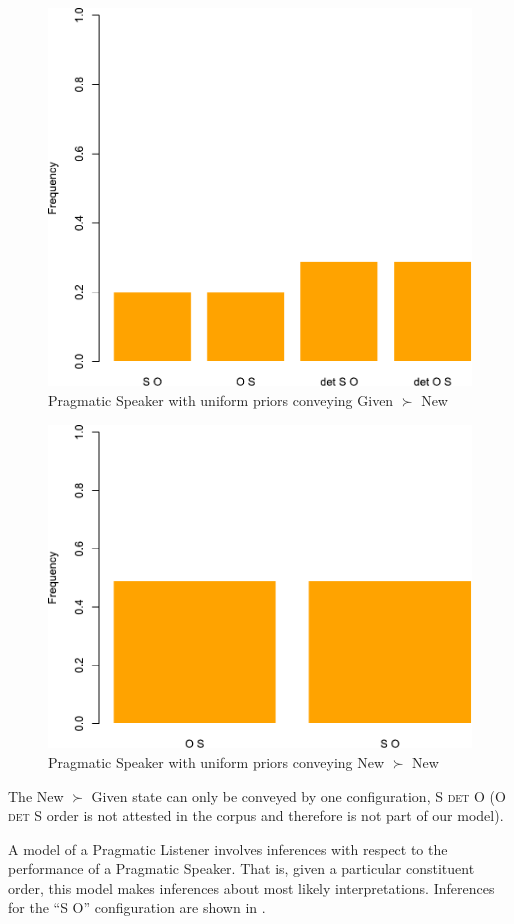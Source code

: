 \documentclass[output=paper,modfonts,nonflat]{langsci/langscibook}
\begin{document}
\begin{figure}
\includegraphics[width=.666\textwidth]{figures/plotPragmaticSpeakerGivenNewUniform}
\caption{Pragmatic Speaker with uniform priors conveying Given $\succ$ New}\label{figure:uniform3}
\end{figure}

\begin{figure}
\includegraphics[width=.666\textwidth]{figures/plotPragmaticSpeakerNewNewUniform}
\caption{Pragmatic Speaker with uniform priors conveying New $\succ$ New}\label{figure:uniform4}
\end{figure}

The New $\succ$ Given state can only be conveyed by one configuration, S {\scshape det} O (O {\scshape det} S order is not attested in the corpus and therefore is not part of our model).

A model of a Pragmatic Listener involves inferences with respect to the performance of a Pragmatic Speaker. That is, given a particular constituent order, this model makes inferences about most likely interpretations. Inferences for the  ``S O'' configuration are shown in  .
\end{document}
